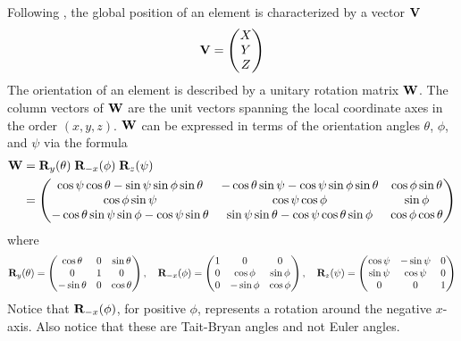 Following \mad, the global position of an element is characterized by a vector ${\bf V}$
\begin{equation}
  {\bf V} = 
  \begin{pmatrix}
    X \\ Y \\ Z 
  \end{pmatrix}
\end{equation}
The orientation of an element is described by a unitary rotation matrix ${\bf W}$. The column vectors
of ${\bf W}$ are the unit vectors spanning the local coordinate axes in the order $(x, y, z)$. ${\bf W}$
can be expressed in terms of the orientation angles $\theta$, $\phi$, and $\psi$ via the formula
\begin{align}
  {\bf W} &= {\bf R}_{y}(\theta) \; {\bf R}_{-x}(\phi) \; {\bf R}_{z}(\psi) 
  \label{wwww} \\
  &= \begin{pmatrix}
    \cos\psi \cos\theta-\sin\psi \sin\phi \sin\theta & -\cos\theta \sin\psi-\cos\psi \sin\phi \sin\theta & 
                                                                                          \cos\phi \sin\theta \\
    \cos\phi \sin\psi & \cos\psi \cos\phi & \sin\phi \\
   -\cos\theta \sin\psi \sin\phi-\cos\psi \sin\theta & \sin\psi \sin\theta-\cos\psi \cos\theta \sin\phi & 
                                                                                          \cos\phi \cos\theta
  \end{pmatrix}
  \nonumber
\end{align}
where
\begin{equation}
  {\bf R}_{y}(\theta) = 
  \begin{pmatrix}
    \cos\theta  & 0 & \sin\theta \\
    0           & 1 & 0          \\
    -\sin\theta & 0 & \cos\theta 
  \end{pmatrix}, \quad
  {\bf R}_{-x}(\phi) = 
  \begin{pmatrix}
    1 & 0 & 0                \\
    0 & \cos\phi  & \sin\phi \\
    0 & -\sin\phi & \cos\phi 
  \end{pmatrix}, \quad
  {\bf R}_{z}(\psi) = 
  \begin{pmatrix}
    \cos\psi & -\sin\psi & 0 \\
    \sin\psi &  \cos\psi & 0 \\
    0        &  0        & 1                
  \end{pmatrix}
  \label{wtt0t}
\end{equation}
Notice that ${\bf R}_{-x}(\phi)$, for positive $\phi$, represents a rotation around the negative
$x$-axis. Also notice that these are Tait-Bryan angles and not Euler angles.

